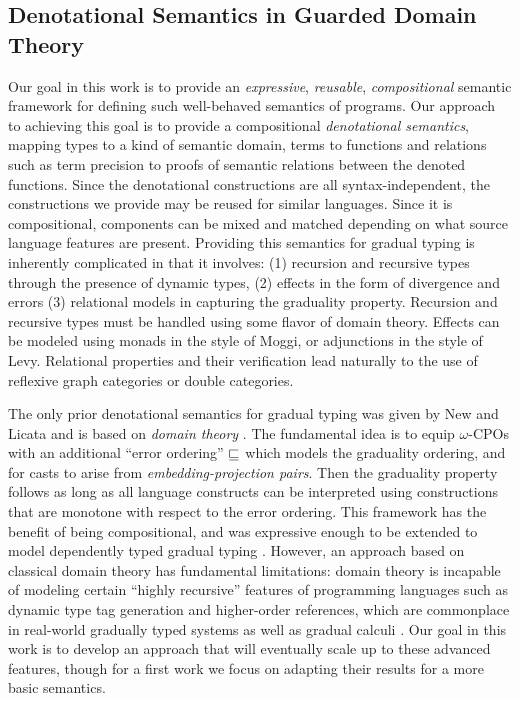 \subsection{Denotational Semantics in Guarded Domain Theory}

Our goal in this work is to provide an \emph{expressive},
\emph{reusable}, \emph{compositional} semantic framework for defining
such well-behaved semantics of programs.
%
Our approach to achieving this goal is to provide a compositional
\emph{denotational semantics}, mapping types to a kind of semantic
domain, terms to functions and relations such as term precision to
proofs of semantic relations between the denoted functions.
%
Since the denotational constructions are all syntax-independent, the
constructions we provide may be reused for similar languages. Since it
is compositional, components can be mixed and matched depending on
what source language features are present.
%
Providing this semantics for gradual typing is inherently complicated
in that it involves: (1) recursion and recursive types through the
presence of dynamic types, (2) effects in the form of divergence and
errors (3) relational models in capturing the graduality
property. Recursion and recursive types must be handled using some
flavor of domain theory. Effects can be modeled using monads in the
style of Moggi, or adjunctions in the style of Levy. Relational
properties and their verification lead naturally to the use of
reflexive graph categories or double categories.

The only prior denotational semantics for gradual typing was given by
New and Licata and is based on \emph{domain theory}
\cite{newlicata2019}. The fundamental idea is to equip $\omega$-CPOs
with an additional ``error ordering'' $\sqsubseteq$ which models the
graduality ordering, and for casts to arise from
\emph{embedding-projection pairs}. Then the graduality property
follows as long as all language constructs can be interpreted using
constructions that are monotone with respect to the error ordering.
%
This framework has the benefit of being compositional, and was
expressive enough to be extended to model dependently typed gradual
typing \cite{dependentgradualtyping}.
%
However, an approach based on classical domain theory has fundamental
limitations: domain theory is incapable of modeling certain ``highly
recursive'' features of programming languages such as dynamic type tag
generation and higher-order references, which are commonplace in
real-world gradually typed systems as well as gradual calculi
\cite{examples-of-gradual-stuff}. Our goal in this work is to develop
an approach that will eventually scale up to these advanced features,
though for a first work we focus on adapting their results for a more
basic semantics.


